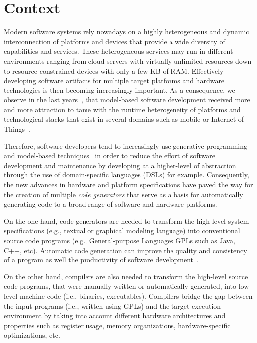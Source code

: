 

\section{Context}
Modern software systems rely nowadays on a highly heterogeneous and dynamic interconnection of platforms and devices that provide a wide diversity of capabilities and services. These heterogeneous services may run in different environments ranging from cloud servers with virtually unlimited resources down to resource-constrained devices with only a few KB of RAM. Effectively developing software artifacts for multiple target platforms and hardware technologies is then becoming increasingly important. As a consequence, we observe in the last years~\cite{Czarnecki:2000:GPM:345203}, that model-based software development received more and more attraction to tame with the runtime heterogeneity of platforms and technological stacks that exist in several domains such as mobile or Internet of Things~\cite{betz2011improving}.

Therefore, software developers tend to increasingly use generative programming~\cite{Czarnecki:2000:GPM:345203} and model-based techniques~\cite{france2007model} in order to reduce the effort of software development and maintenance by developing at a higher-level of abstraction through the use of domain-specific languages (DSLs) for example. 
Consequently, the new advances in hardware and platform specifications have paved the way for the creation of multiple \textit{code generators} that serve as a basis for automatically generating code to a broad range of software and hardware platforms. 

On the one hand, code generators are needed to transform the high-level system specifications (e.g., textual or graphical modeling language) into conventional source code programs (e.g., General-purpose Languages GPLs such as Java, C++, etc). Automatic code generation can  improve the quality and consistency of a program as well  the productivity of software development~\cite{kapteijns2009comparative}.

On the other hand, compilers are also needed to transform the high-level source code programs, that were manually written or automatically generated, into low-level machine code (i.e., binaries, executables). 
Compilers bridge the gap between the input programs (i.e., written using GPLs) and the target execution environment by taking into account different hardware architectures and properties such as register usage, memory organizations, hardware-specific optimizations, etc. 


